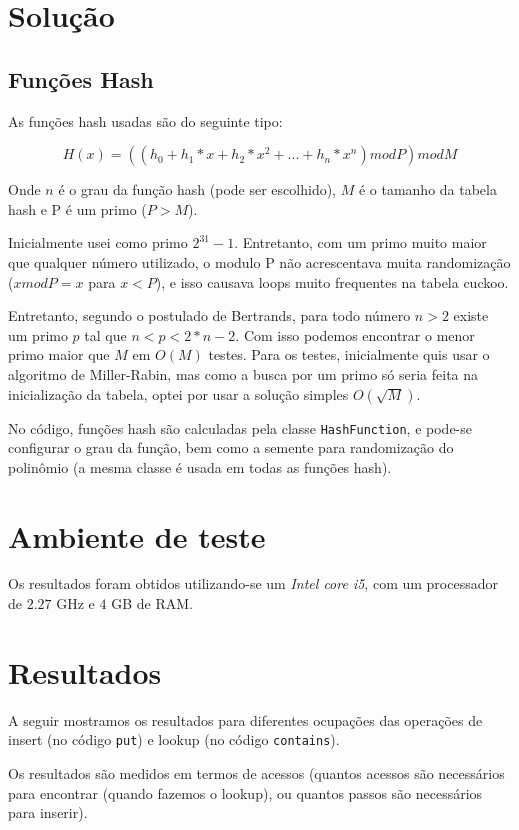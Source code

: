 \documentclass{article}
\begin{document}
\section{Solução}

\subsection{Funções Hash}

As funções hash usadas são do seguinte tipo:

$$ H(x) = ((h_0 + h_1 * x + h_2 * x^2 + ... + h_n * x^n) mod P) mod M $$

Onde $n$ é o grau da função hash (pode ser escolhido), $M$ é o tamanho da tabela hash e P é um
primo ($P > M$).

Inicialmente usei como primo $2^{31} - 1$. Entretanto, com um primo muito maior que qualquer número
utilizado, o modulo P não acrescentava muita randomização ($ x mod P = x$ para $x < P$), e isso
causava loops muito frequentes na tabela cuckoo.

Entretanto, segundo o postulado de Bertrands, para todo número $n > 2$ existe um primo $p$ tal que
$n < p < 2 * n - 2$. Com isso podemos encontrar o menor primo maior que $M$ em $O(M)$ testes. Para
os testes, inicialmente quis usar o algoritmo de Miller-Rabin, mas como a busca por um primo só
seria feita na inicialização da tabela, optei por usar a solução simples $O(\sqrt{M})$.

No código, funções hash são calculadas pela classe \texttt{HashFunction}, e pode-se configurar o
grau da função, bem como a semente para randomização do polinômio (a mesma classe é usada em todas
as funções hash).

\section{Ambiente de teste}

Os resultados foram obtidos utilizando-se um \emph{Intel core i5}, com um processador de $2.27$ GHz
e $4$ GB de RAM.

\section{Resultados}

A seguir mostramos os resultados para diferentes ocupações das operações de insert (no código
\texttt{put}) e lookup (no código \texttt{contains}).

Os resultados são medidos em termos de acessos (quantos acessos são necessários para encontrar
(quando fazemos o lookup), ou quantos passos são necessários para inserir).
\end{document}
